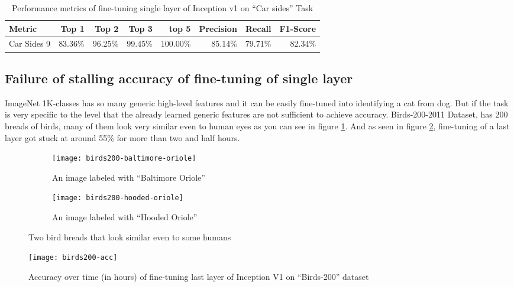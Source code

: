 \begin{table*}\caption{Performance metrics of fine-tuning single layer of Inception v1 on ``Car sides'' Task}\label{table:car-sides-metrics}
\centering
\begin{tabular}{lrrrrrrr}
\toprule
Metric         & Top 1   & Top 2 & Top 3 & top 5 & Precision & Recall & F1-Score \\
\midrule
Car Sides 9 & 83.36\% & 96.25\% & 99.45\% & 100.00\% & 85.14\% & 79.71\% & 82.34\% \\
\bottomrule
\end{tabular}
\end{table*}


\subsection{Failure of stalling accuracy of fine-tuning of single layer}

ImageNet 1K-classes has so many generic high-level features and it can be easily fine-tuned into identifying a cat from dog.
But if the task is very specific to the level that the already learned generic features are not sufficient to achieve accuracy.
Birds-200-2011 Dataset\autocite{WahCUB_200_2011}, has 200 breads of birds, many of them look very similar even to human eyes
as you can see in figure \ref{fig:confusion-birds200}.
And as seen in figure \ref{fig:fine-birds200-acc}, fine-tuning of a last layer got stuck at around 55\% for more than two and half hours.

\begin{figure}[!htbp]
\centering
    \begin{subfigure}[t]{0.48\textwidth}
        \centering
        \texttt{[image: birds200-baltimore-oriole]}
        \caption{An image labeled with ``Baltimore Oriole''}
    \end{subfigure}
    \begin{subfigure}[t]{0.48\textwidth}
        \centering
        \texttt{[image: birds200-hooded-oriole]}
        \caption{An image labeled with ``Hooded Oriole''}
    \end{subfigure}
\caption{Two bird breads that look similar even to some humans}\label{fig:confusion-birds200}
\end{figure}


\begin{figure}[!h]
\centering
\texttt{[image: birds200-acc]}
\caption{Accuracy over time (in hours) of fine-tuning last layer of Inception V1 on ``Birds-200'' dataset}\label{fig:fine-birds200-acc}
\end{figure}

